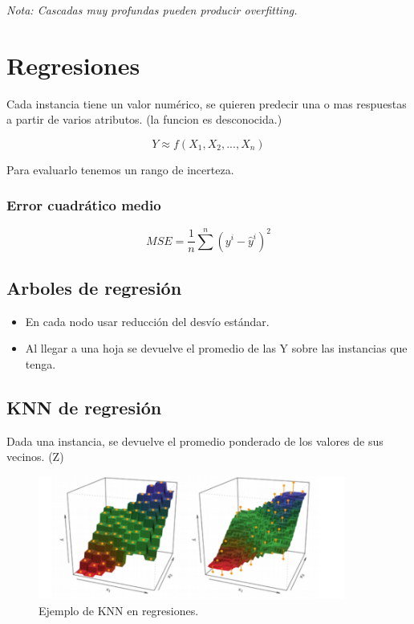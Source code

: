 \documentclass[titlepage,a4paper]{article}
\begin{document}
\textit{Nota: Cascadas muy profundas pueden producir overfitting.}

\newpage


\section{Regresiones}

Cada instancia tiene un valor numérico, se quieren predecir una o mas respuestas a partir de varios atributos.  (la funcion es desconocida.)

\begin{equation}
    Y \approx f(X_1, X_2,..., X_n)
\end{equation}


Para evaluarlo tenemos un rango de incerteza.

\subsubsection*{Error cuadrático medio}
\begin{equation}
    MSE = \frac{1}{n} \sum^{n} (y^{i}-\hat{y}^{i})^{2}
\end{equation}

\subsection{Arboles de regresión}
\begin{itemize}
    \item En cada nodo usar reducción del desvío estándar.
    \item Al llegar a una hoja se devuelve el promedio de las Y sobre las instancias que tenga.
\end{itemize}


\subsection{KNN de regresión}
Dada una instancia, se devuelve el promedio ponderado de los valores de sus vecinos. (Z)

\begin{figure}[!htb]
    \centering
    \includegraphics[width=0.9\textwidth]{imagenesResumen/KNNRegresion.PNG}
    \caption{Ejemplo de KNN en regresiones.}
\end{figure}
\end{document}
